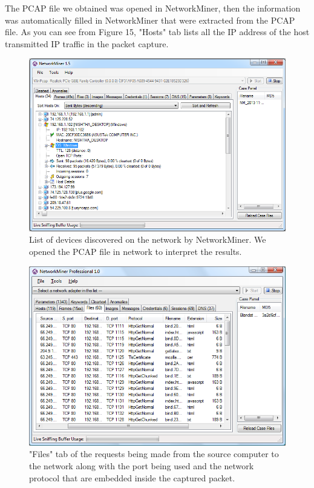 \documentclass{article}
\begin{document}
The PCAP file we obtained was opened in NetworkMiner, then the information was automatically filled in NetworkMiner that were extracted from the PCAP file. As you can see from Figure 15, "Hosts" tab lists all the IP address of the host transmitted IP traffic in the packet capture. 
\begin{figure}[H]
	\begin{center}
		\includegraphics[width=0.6
\textwidth]{FINDINGANN1.png}
	\end{center}
	\caption{List of devices discovered on the network by NetworkMiner. We opened the PCAP file in network to interpret the results. }
	\label{fig:Prd}
\end{figure}

\begin{figure}[H]
	\begin{center}
		\includegraphics[width=0.6
\textwidth]{FINDINGANN2.png}
	\end{center}
	\caption{"Files" tab of the requests being made from the source computer to the network along with the port being used and the network protocol that are embedded inside the captured packet.}
	\label{fig:Prd}
\end{figure}
\end{document}
